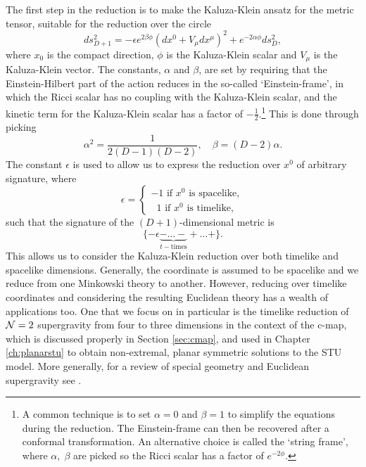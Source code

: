 The first step in the reduction is to make the Kaluza-Klein ansatz for the metric tensor, suitable for the reduction over the circle
\begin{equation}
\label{eq:KKansatz}
  ds^2_{D+1} = - \epsilon e^{2 \beta \phi} (dx^0 + V_\mu dx^\mu)^2 + e^{-2\alpha \phi} ds_D^2,
\end{equation}
where $x_0$ is the compact direction, $\phi$ is the Kaluza-Klein scalar and $V_\mu$ is the Kaluza-Klein vector. The constants, $\alpha$ and $\beta$, are set by requiring that the Einstein-Hilbert part of the action reduces in the so-called `Einstein-frame', in which the Ricci scalar has no coupling with the Kaluza-Klein scalar, and the kinetic term for the Kaluza-Klein scalar has a factor of $-\tfrac{1}{2}$.\footnote{A common technique is to set $\alpha = 0$ and $\beta = 1$ to simplify the equations during the reduction. The Einstein-frame can then be recovered after a conformal transformation. An alternative choice is called the `string frame', where $\alpha, \; \beta$ are picked so the Ricci scalar has a factor of $e^{-2\phi}$.} This is done through picking
\begin{equation*}
\alpha^2 = \frac{1}{2(D-1)(D-2)}, \quad \beta = (D-2)\alpha .
\end{equation*}
The constant $\epsilon$ is used to allow us to express the reduction over $x^0$ of arbitrary signature, where
\begin{equation*}
\epsilon = \begin{cases}
	-1 \text{ if $x^0$ is spacelike}, \\
	\hspace{7pt} 1 \text{ if $x^0$ is timelike},
\end{cases}  
\end{equation*}
such that the signature of the $(D+1)$-dimensional metric is
\begin{equation*}
	\{ - \epsilon \underbrace{- \ldots -}_{t-\text{times}} + \ldots + \}.
\end{equation*}
This allows us to consider the Kaluza-Klein reduction over both timelike and spacelike dimensions. Generally, the coordinate is assumed to be spacelike and we reduce from one Minkowski theory to another. However, reducing over timelike coordinates and considering the resulting Euclidean theory has a wealth of applications too. One that we focus on in particular is the timelike reduction of ${\cal N} = 2$ supergravity from four to three dimensions in the context of the c-map, which is discussed properly in Section \ref{sec:cmap}, and used in Chapter \ref{ch:planarstu} to obtain non-extremal, planar symmetric solutions to the STU model. More generally, for a review of special geometry and Euclidean supergravity see \cite{Cortes:2015wca, Cortes:2009cs, Cortes:2003zd, Cortes:2005uq}.

